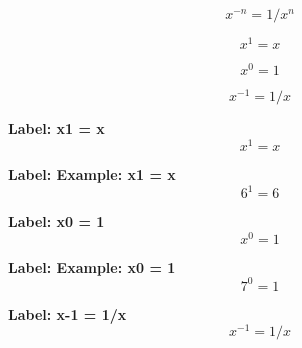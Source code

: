 \[x^{-n} = 1/x^{n}\]

\[x^{1} = x\]

\[x^{0} = 1\]

\[x^{-1} = 1/x\]

\textbf{Label: x1 = x}
\[x^{1} = x\]

\textbf{Label: Example: x1 = x}
\[6^{1}=6\]

\textbf{Label: x0 = 1}
\[x^{0} = 1\]

\textbf{Label: Example: x0 = 1}
\[7^{0}=1\]

\textbf{Label: x-1 = 1/x}
\[x^{-1} = 1/x\]

